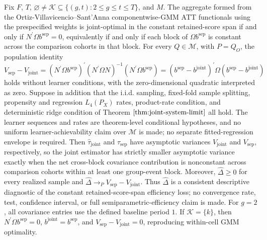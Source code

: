 Fix \(F\), \(T\), \(\varnothing\ne\mathcal K\subseteq\{(g,t):2\le g\le t\le T\}\), and \(M\). The aggregate formed from the Ortiz-Villavicencio--Sant'Anna componentwise-GMM ATT functionals using the prespecified weights is joint-optimal in the constant retained-score span if and only if \(N^{\prime}\Omega b^{\mathrm{sep}}=0\), equivalently if and only if each block of \(\Omega b^{\mathrm{sep}}\) is constant across the comparison cohorts in that block. For every \(Q\in\mathcal M\), with \(P=Q_O\), the population identity
\[
V_{\mathrm{sep}}-V_{\mathrm{joint}}
=(N^{\prime}\Omega b^{\mathrm{sep}})^{\prime}(N^{\prime}\Omega N)^{-1}(N^{\prime}\Omega b^{\mathrm{sep}})
=(b^{\mathrm{sep}}-b^{\mathrm{joint}})^{\prime}\Omega(b^{\mathrm{sep}}-b^{\mathrm{joint}})
\]
holds without learner conditions, with the zero-dimensional quadratic interpreted as zero. Suppose in addition that the i.i.d. sampling, fixed-fold sample splitting, propensity and regression \(L_4(P_X)\) rates, product-rate condition, and deterministic ridge condition of Theorem \(\ref{thm:joint-system-limit}\) all hold. The learner sequences and rates are theorem-level conditional hypotheses, and no uniform learner-achievability claim over \(\mathcal M\) is made; no separate fitted-regression envelope is required. Then \(\widehat\tau_{\mathrm{joint}}\) and \(\widehat\tau_{\mathrm{sep}}\) have asymptotic variances \(V_{\mathrm{joint}}\) and \(V_{\mathrm{sep}}\), respectively, so the joint estimator has strictly smaller asymptotic variance exactly when the net cross-block covariance contribution is nonconstant across comparison cohorts within at least one group-event block. Moreover, \(\widehat\Delta\ge0\) for every realized sample and \(\widehat\Delta\to_P V_{\mathrm{sep}}-V_{\mathrm{joint}}\). Thus \(\widehat\Delta\) is a consistent descriptive diagnostic of the constant retained-score-span efficiency loss; no convergence rate, test, confidence interval, or full semiparametric-efficiency claim is made. For \(g=2\), all covariance entries use the defined baseline period \(1\). If \(\mathcal K=\{k\}\), then \(N^{\prime}\Omega b^{\mathrm{sep}}=0\), \(b^{\mathrm{joint}}=b^{\mathrm{sep}}\), and \(V_{\mathrm{sep}}-V_{\mathrm{joint}}=0\), reproducing within-cell GMM optimality.
